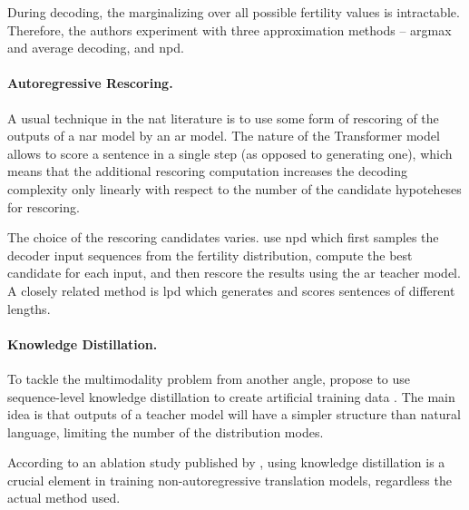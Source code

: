 During decoding, the marginalizing over all possible fertility values is
intractable. Therefore, the authors experiment with three approximation methods
-- argmax and average decoding, and \ac{npd}.

\paragraph{Autoregressive Rescoring.} A usual technique in the \ac{nat}
literature is to use some form of rescoring of the outputs of a \acl{nar} model
by an \acl{ar} model. The nature of the Transformer model allows to score a
sentence in a single step (as opposed to generating one), which means that the
additional rescoring computation increases the decoding complexity only
linearly with respect to the number of the candidate hypoteheses for rescoring.

The choice of the rescoring candidates varies. \citet{gu2017nonautoregressive}
use \ac{npd} which first samples the decoder input sequences from the fertility
distribution, compute the best candidate for each input, and then rescore the
results using the \ac{ar} teacher model. A closely related method is \ac{lpd}
which generates and scores sentences of different lengths.

\paragraph{Knowledge Distillation.} To tackle the multimodality problem from
another angle, \citet{gu2017nonautoregressive} propose to use sequence-level
knowledge distillation to create artificial training data
\citep{kim-rush-2016-sequence}. The main idea is that outputs of a teacher
model will have a simpler structure than natural language, limiting the number
of the distribution modes.

According to an ablation study published by \citet{gu-kong-2021-fully}, using
knowledge distillation is a crucial element in training non-autoregressive
translation models, regardless the actual method used.

